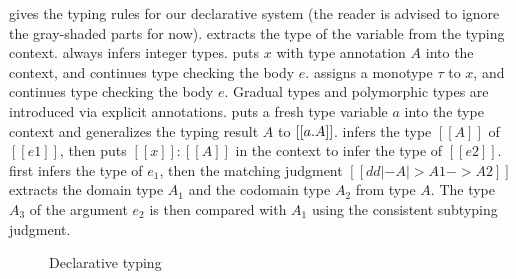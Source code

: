  gives the typing rules for our declarative system
(the reader is advised to ignore the gray-shaded parts for now). 
extracts the type of the variable from the typing context.  always
infers integer types.  puts $x$ with type annotation $A$ into
the context, and continues type checking the body $e$.  assigns a
monotype $\tau$ to $x$, and continues type checking the body $e$. Gradual types
and polymorphic types are introduced via explicit annotations.
 puts a fresh type variable $a$ into the type context and generalizes
the typing result $A$ to $[[ \/a. A ]]$.
 infers the type $[[A]]$ of $[[e1]]$, then puts $[[x]] : [[A]]$ in the
context to infer the type of $[[e2]]$.
 first
infers the type of $e_1$, then the matching judgment $[[ dd |- A |> A1 -> A2 ]]$ extracts the domain type $A_1$ and the codomain type $A_2$ from type
$A$. The type $A_3$ of the argument $e_2$ is then compared with $A_1$ using the
consistent subtyping judgment.

\begin{figure}[t]
  \begin{small}





  \end{small}
  \caption{Declarative typing}
  \label{fig:decl-typing}
\end{figure}

